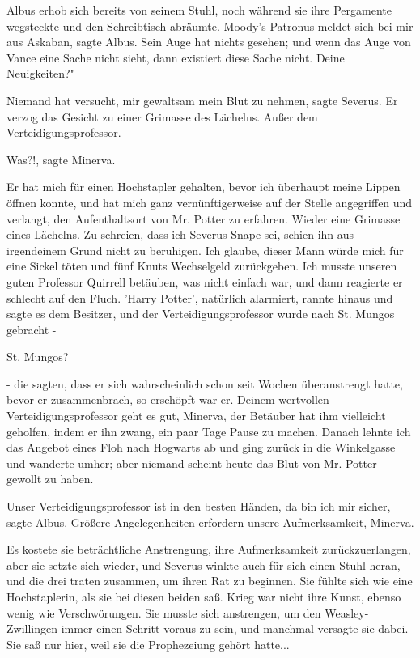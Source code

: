Albus erhob sich bereits von seinem Stuhl, noch während sie ihre Pergamente
wegsteckte und den Schreibtisch abräumte. \glqq{}Moody's Patronus meldet sich bei
mir aus Askaban\grqq{}, sagte Albus. \glqq{}Sein Auge hat nichts gesehen; und
wenn das Auge von Vance eine Sache nicht sieht, dann existiert diese Sache
nicht. Deine Neuigkeiten?"

\glqq{}Niemand hat versucht, mir gewaltsam mein Blut zu nehmen\grqq{}, sagte
Severus. Er verzog das Gesicht zu einer Grimasse des Lächelns. \glqq{}Außer dem
Verteidigungsprofessor.\grqq{}

\glqq{}Was?!\grqq{}, sagte Minerva.

\glqq{}Er hat mich für einen Hochstapler gehalten, bevor ich überhaupt meine
Lippen öffnen konnte, und hat mich ganz vernünftigerweise auf der Stelle
angegriffen und verlangt, den Aufenthaltsort von Mr. Potter zu erfahren.\grqq{}
Wieder eine Grimasse eines Lächelns. \glqq{}Zu schreien, dass ich Severus Snape
sei, schien ihn aus irgendeinem Grund nicht zu beruhigen. Ich glaube, dieser
Mann würde mich für eine Sickel töten und fünf Knuts Wechselgeld zurückgeben.
Ich musste unseren guten Professor Quirrell betäuben, was nicht einfach war, und
dann reagierte er schlecht auf den Fluch. 'Harry Potter', natürlich alarmiert,
rannte hinaus und sagte es dem Besitzer, und der Verteidigungsprofessor wurde
nach St. Mungos gebracht -\grqq{}

\glqq{}St. Mungos?\grqq{}

\glqq{}- die sagten, dass er sich wahrscheinlich schon seit Wochen überanstrengt
hatte, bevor er zusammenbrach, so erschöpft war er. Deinem wertvollen
Verteidigungsprofessor geht es gut, Minerva, der Betäuber hat ihm vielleicht
geholfen, indem er ihn zwang, ein paar Tage Pause zu machen. Danach lehnte ich
das Angebot eines Floh nach Hogwarts ab und ging zurück in die Winkelgasse und
wanderte umher; aber niemand scheint heute das Blut von Mr. Potter gewollt zu
haben.\grqq{}

\glqq{}Unser Verteidigungsprofessor ist in den besten Händen, da bin ich mir
sicher\grqq{}, sagte Albus. \glqq{}Größere Angelegenheiten erfordern unsere
Aufmerksamkeit, Minerva.\grqq{}

Es kostete sie beträchtliche Anstrengung, ihre Aufmerksamkeit zurückzuerlangen,
aber sie setzte sich wieder, und Severus winkte auch für sich einen Stuhl heran,
und die drei traten zusammen, um ihren Rat zu beginnen. Sie fühlte sich wie eine
Hochstaplerin, als sie bei diesen beiden saß. Krieg war nicht ihre Kunst, ebenso
wenig wie Verschwörungen. Sie musste sich anstrengen, um den Weasley-Zwillingen
immer einen Schritt voraus zu sein, und manchmal versagte sie dabei. Sie saß nur
hier, weil sie die Prophezeiung gehört hatte...

